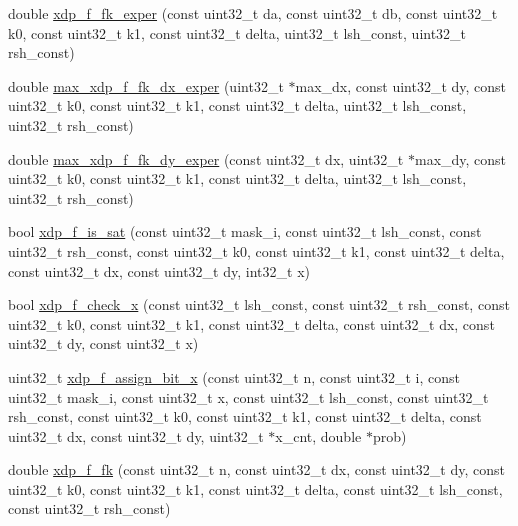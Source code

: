 \begin{DoxyCompactItemize}
\item 
double \hyperlink{xdp-tea-f-fk_8cc_af2db89390c1b79d21e9426301133677a}{xdp\-\_\-f\-\_\-fk\-\_\-exper} (const uint32\-\_\-t da, const uint32\-\_\-t db, const uint32\-\_\-t k0, const uint32\-\_\-t k1, const uint32\-\_\-t delta, uint32\-\_\-t lsh\-\_\-const, uint32\-\_\-t rsh\-\_\-const)
\item 
double \hyperlink{xdp-tea-f-fk_8cc_ae697ec9a1dcb67277eee7817501f9fa9}{max\-\_\-xdp\-\_\-f\-\_\-fk\-\_\-dx\-\_\-exper} (uint32\-\_\-t $\ast$max\-\_\-dx, const uint32\-\_\-t dy, const uint32\-\_\-t k0, const uint32\-\_\-t k1, const uint32\-\_\-t delta, uint32\-\_\-t lsh\-\_\-const, uint32\-\_\-t rsh\-\_\-const)
\item 
double \hyperlink{xdp-tea-f-fk_8cc_a3eba231310409bff7512be456f0329b4}{max\-\_\-xdp\-\_\-f\-\_\-fk\-\_\-dy\-\_\-exper} (const uint32\-\_\-t dx, uint32\-\_\-t $\ast$max\-\_\-dy, const uint32\-\_\-t k0, const uint32\-\_\-t k1, const uint32\-\_\-t delta, uint32\-\_\-t lsh\-\_\-const, uint32\-\_\-t rsh\-\_\-const)
\item 
bool \hyperlink{xdp-tea-f-fk_8cc_aba9a33f69d29af6f9ffea5590bc902d2}{xdp\-\_\-f\-\_\-is\-\_\-sat} (const uint32\-\_\-t mask\-\_\-i, const uint32\-\_\-t lsh\-\_\-const, const uint32\-\_\-t rsh\-\_\-const, const uint32\-\_\-t k0, const uint32\-\_\-t k1, const uint32\-\_\-t delta, const uint32\-\_\-t dx, const uint32\-\_\-t dy, int32\-\_\-t x)
\item 
bool \hyperlink{xdp-tea-f-fk_8cc_a3aa2bec1e1d27e27741f2f7e46f4ac28}{xdp\-\_\-f\-\_\-check\-\_\-x} (const uint32\-\_\-t lsh\-\_\-const, const uint32\-\_\-t rsh\-\_\-const, const uint32\-\_\-t k0, const uint32\-\_\-t k1, const uint32\-\_\-t delta, const uint32\-\_\-t dx, const uint32\-\_\-t dy, const uint32\-\_\-t x)
\item 
uint32\-\_\-t \hyperlink{xdp-tea-f-fk_8cc_acce345a641b8a7372b2b2a562fc1ba8c}{xdp\-\_\-f\-\_\-assign\-\_\-bit\-\_\-x} (const uint32\-\_\-t n, const uint32\-\_\-t i, const uint32\-\_\-t mask\-\_\-i, const uint32\-\_\-t x, const uint32\-\_\-t lsh\-\_\-const, const uint32\-\_\-t rsh\-\_\-const, const uint32\-\_\-t k0, const uint32\-\_\-t k1, const uint32\-\_\-t delta, const uint32\-\_\-t dx, const uint32\-\_\-t dy, uint32\-\_\-t $\ast$x\-\_\-cnt, double $\ast$prob)
\item 
double \hyperlink{xdp-tea-f-fk_8cc_aa4597c33ca147a102d557fc93c23b802}{xdp\-\_\-f\-\_\-fk} (const uint32\-\_\-t n, const uint32\-\_\-t dx, const uint32\-\_\-t dy, const uint32\-\_\-t k0, const uint32\-\_\-t k1, const uint32\-\_\-t delta, const uint32\-\_\-t lsh\-\_\-const, const uint32\-\_\-t rsh\-\_\-const)

\end{DoxyCompactItemize}
